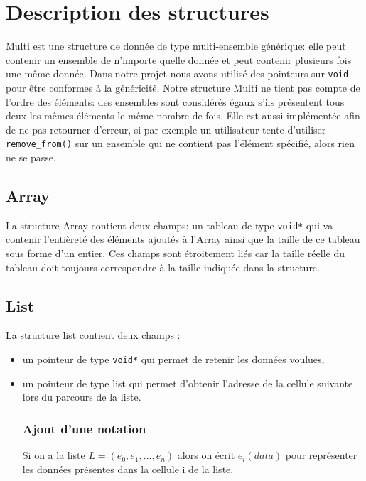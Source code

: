 \documentclass[a4paper, 11pt, oneside]{article}
\begin{document}
	\clearpage
\section{Description des structures}
	Multi est une structure de donnée de type multi-ensemble générique: elle peut contenir un ensemble de n'importe quelle donnée et peut contenir plusieurs fois une même donnée. Dans notre projet nous avons utilisé des pointeurs sur \texttt{void} pour être conformes à la généricité. Notre structure Multi ne tient pas compte de l'ordre des éléments: des ensembles sont considérés égaux s'ils présentent tous deux les mêmes éléments le même nombre de fois. Elle est aussi implémentée afin de ne pas retourner d'erreur, si par exemple un utilisateur tente d'utiliser \texttt{remove\_from()} sur un ensemble qui ne contient pas l'élément spécifié, alors rien ne se passe.
	\subsection{Array}
		La structure Array contient deux champs: un tableau de type \texttt{void*} qui va contenir l'entièreté des éléments ajoutés à l'Array ainsi que la taille de ce tableau sous forme d'un entier. Ces champs sont étroitement liés car la taille réelle du tableau doit toujours correspondre à la taille indiquée dans la structure.
	\subsection{List}
		La structure list contient deux champs :
		\begin{itemize}
			\item un pointeur de type \texttt{void*} qui permet de retenir les données voulues,
			\item un pointeur de type list qui permet d'obtenir l'adresse de la cellule suivante lors du parcours de la liste. 
	\subsubsection{Ajout d'une notation}
	Si on a la liste $L = (e_0, e_1,..., e_n)$ alors on écrit $e_i(data)$ pour représenter les données présentes dans la cellule i de la liste. 
		\end{itemize}

	
\end{document}
